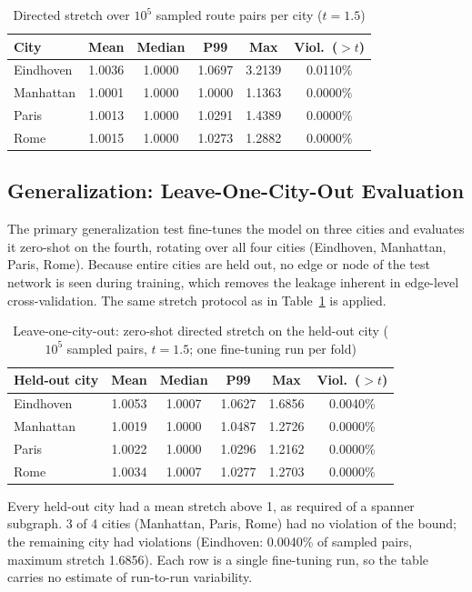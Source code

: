 \documentclass[journal]{IEEEtran}
\begin{document}
\begin{table}[h]
\centering
\caption{Directed stretch over $10^5$ sampled route pairs per city ($t = 1.5$)}
\begin{tabular}{lccccc}
\toprule
City & Mean & Median & P99 & Max & Viol.\ ($>t$) \\
\midrule
Eindhoven & 1.0036 & 1.0000 & 1.0697 & 3.2139 & 0.0110\% \\
Manhattan & 1.0001 & 1.0000 & 1.0000 & 1.1363 & 0.0000\% \\
Paris     & 1.0013 & 1.0000 & 1.0291 & 1.4389 & 0.0000\% \\
Rome      & 1.0015 & 1.0000 & 1.0273 & 1.2882 & 0.0000\% \\
\bottomrule
\end{tabular}
\label{tab:mc}
\end{table}

\subsection{Generalization: Leave-One-City-Out Evaluation}
\label{sec:loco}
The primary generalization test fine-tunes the model on three cities and evaluates it zero-shot on the fourth, rotating over all four cities (Eindhoven, Manhattan, Paris, Rome). Because entire cities are held out, no edge or node of the test network is seen during training, which removes the leakage inherent in edge-level cross-validation. The same stretch protocol as in Table~\ref{tab:mc} is applied.

\begin{table}[h]
\centering
\caption{Leave-one-city-out: zero-shot directed stretch on the held-out city ($10^5$ sampled pairs, $t = 1.5$; one fine-tuning run per fold)}
\begin{tabular}{lccccc}
\toprule
Held-out city & Mean & Median & P99 & Max & Viol.\ ($>t$) \\
\midrule
Eindhoven & 1.0053 & 1.0007 & 1.0627 & 1.6856 & 0.0040\% \\
Manhattan & 1.0019 & 1.0000 & 1.0487 & 1.2726 & 0.0000\% \\
Paris & 1.0022 & 1.0000 & 1.0296 & 1.2162 & 0.0000\% \\
Rome & 1.0034 & 1.0007 & 1.0277 & 1.2703 & 0.0000\% \\
\bottomrule
\end{tabular}
\label{tab:loco}
\end{table}

Every held-out city had a mean stretch above 1, as required of a spanner subgraph. 3 of 4 cities (Manhattan, Paris, Rome) had no violation of the bound; the remaining city had violations (Eindhoven: 0.0040\% of sampled pairs, maximum stretch 1.6856). Each row is a single fine-tuning run, so the table carries no estimate of run-to-run variability.
\end{document}
